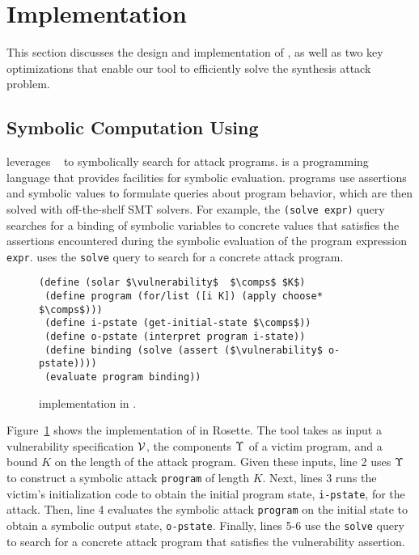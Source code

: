 \section{Implementation}\label{sec:impl}

This section discusses the design and implementation of 
\toolname, as well as two key optimizations that enable our tool 
to efficiently solve the synthesis attack problem.


\subsection{Symbolic Computation Using \rosette}\label{sec:rosette}

\toolname leverages \rosette~\cite{rosette} to symbolically search for attack
programs. \rosette is a programming language that provides facilities for
symbolic evaluation.  \rosette programs use
assertions and symbolic values to formulate queries about program behavior,
which are then solved with off-the-shelf SMT solvers. For example, the
\texttt{(solve expr)} query searches for a binding of symbolic variables to
concrete values that satisfies the assertions encountered during the symbolic
evaluation of the program expression \texttt{expr}. \toolname uses the \texttt{solve}
query to search for a concrete attack program.


\begin{figure}
\centering
  \begin{minipage}{0.5\linewidth}
\begin{lstlisting}[linewidth=8cm] 
(define (solar $\vulnerability$  $\comps$ $K$)
 (define program (for/list ([i K]) (apply choose* $\comps$)))
 (define i-pstate (get-initial-state $\comps$))
 (define o-pstate (interpret program i-state))
 (define binding (solve (assert ($\vulnerability$ o-pstate))))
 (evaluate program binding))
\end{lstlisting}
\end{minipage}
\vspace{-0.1in}
\caption{\toolname implementation in \rosette. 
 }
\label{fig:sketch-overview}
\vspace{-0.1in}
\end{figure}

Figure~\ref{fig:sketch-overview} shows the implementation of \toolname in Rosette. 
The tool takes as input a vulnerability specification
$\mathcal{V}$, the components $\Upsilon$ of a victim program, and a bound $K$ 
on the length of the attack program. Given these inputs, line 2 uses $\Upsilon$ to 
construct a symbolic attack \texttt{program} of length $K$. 
Next, lines 3 runs the victim's initialization code to obtain the 
initial program state, \texttt{i-pstate}, for the attack. 
Then, line 4 evaluates the symbolic attack \texttt{program} on the initial state to 
obtain a symbolic output state, \texttt{o-pstate}. 
Finally, lines 5-6 use the \texttt{solve} query to search for a concrete
attack program that satisfies the vulnerability assertion.

